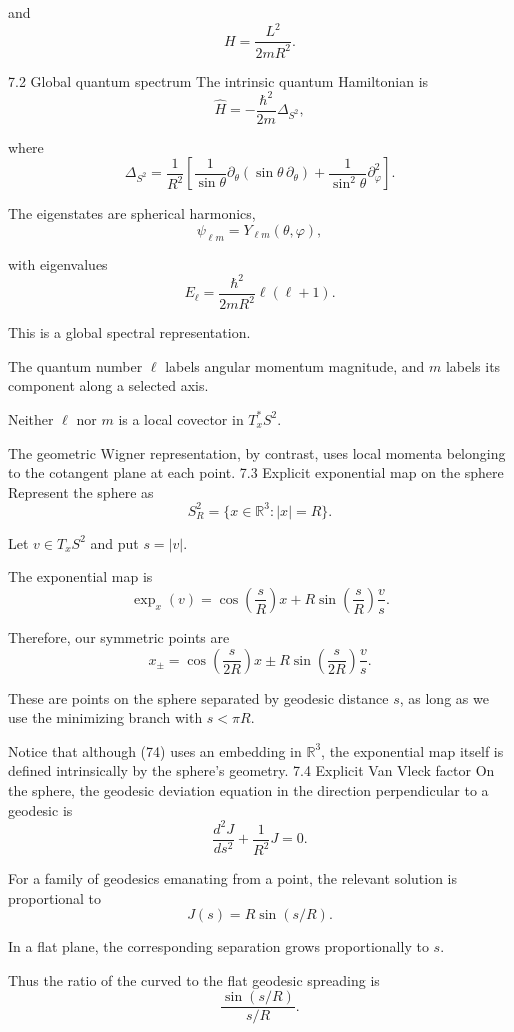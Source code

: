 and
\[
H=\frac{L^2}{2mR^2}.
\tag{71}
\]

7.2 Global quantum spectrum
The intrinsic quantum Hamiltonian is
\[
\widehat H=-\frac{\hbar^2}{2m}\Delta_{S^2},
\]

where
\[
\Delta_{S^2}=
\frac1{R^2}
\left[
\frac1{\sin\theta}\partial_\theta
(\sin\theta\,\partial_\theta)
+
\frac1{\sin^2\theta}\partial_\varphi^2
\right].
\tag{72}
\]

The eigenstates are spherical harmonics,
\[
\psi_{\ell m}=Y_{\ell m}(\theta,\varphi),
\]

with eigenvalues
\[
\boxed{
E_\ell=
\frac{\hbar^2}{2mR^2}\ell(\ell+1).
}
\tag{73}
\]

This is a global spectral representation.

The quantum number \(\ell\) labels angular momentum magnitude, and \(m\) labels its component along a selected axis.

Neither \(\ell\) nor \(m\) is a local covector in \(T_x^*S^2\).

The geometric Wigner representation, by contrast, uses local momenta belonging to the cotangent plane at each point.
7.3 Explicit exponential map on the sphere
Represent the sphere as
\[
S_R^2=\{x\in\mathbb R^3:|x|=R\}.
\]

Let \(v\in T_xS^2\) and put \(s=|v|\).

The exponential map is
\[
\boxed{
\exp_x(v)=
\cos\left(\frac{s}{R}\right)x
+
R\sin\left(\frac{s}{R}\right)\frac{v}{s}.
}
\tag{74}
\]

Therefore, our symmetric points are
\[
\boxed{
x_\pm=
\cos\left(\frac{s}{2R}\right)x
\pm
R\sin\left(\frac{s}{2R}\right)\frac{v}{s}.
}
\tag{75}
\]

These are points on the sphere separated by geodesic distance \(s\), as long as we use the minimizing branch with \(s<\pi R\).

Notice that although (74) uses an embedding in \(\mathbb R^3\), the exponential map itself is defined intrinsically by the sphere's geometry.
7.4 Explicit Van Vleck factor
On the sphere, the geodesic deviation equation in the direction perpendicular to a geodesic is
\[
\frac{d^2J}{ds^2}
+\frac1{R^2}J=0.
\tag{76}
\]

For a family of geodesics emanating from a point, the relevant solution is proportional to
\[
J(s)=R\sin(s/R).
\tag{77}
\]

In a flat plane, the corresponding separation grows proportionally to \(s\).

Thus the ratio of the curved to the flat geodesic spreading is
\[
\frac{\sin(s/R)}{s/R}.
\]

